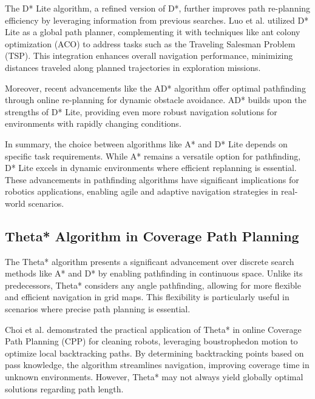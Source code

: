 \vspace*{6mm}

The D* Lite algorithm, a refined version of D*, further improves path re-planning efficiency by leveraging information from previous searches. Luo et al. utilized D* Lite as a global path planner, complementing it with techniques like ant colony optimization (ACO) to address tasks such as the Traveling Salesman Problem (TSP). This integration enhances overall navigation performance, minimizing distances traveled along planned trajectories in exploration missions.

\vspace*{6mm}

Moreover, recent advancements like the AD* algorithm offer optimal pathfinding through online re-planning for dynamic obstacle avoidance. AD* builds upon the strengths of D* Lite, providing even more robust navigation solutions for environments with rapidly changing conditions.

\vspace*{6mm}

In summary, the choice between algorithms like A* and D* Lite depends on specific task requirements. While A* remains a versatile option for pathfinding, D* Lite excels in dynamic environments where efficient replanning is essential. These advancements in pathfinding algorithms have significant implications for robotics applications, enabling agile and adaptive navigation strategies in real-world scenarios.


\subsection{Theta* Algorithm in Coverage Path Planning}

The Theta* algorithm presents a significant advancement over discrete search methods like A* and D* by enabling pathfinding in continuous space. Unlike its predecessors, Theta* considers any angle pathfinding, allowing for more flexible and efficient navigation in grid maps. This flexibility is particularly useful in scenarios where precise path planning is essential.

\vspace*{6mm}

Choi et al. demonstrated the practical application of Theta* in online Coverage Path Planning (CPP) for cleaning robots, leveraging boustrophedon motion to optimize local backtracking paths. By determining backtracking points based on pass knowledge, the algorithm streamlines navigation, improving coverage time in unknown environments. However, Theta* may not always yield globally optimal solutions regarding path length.

